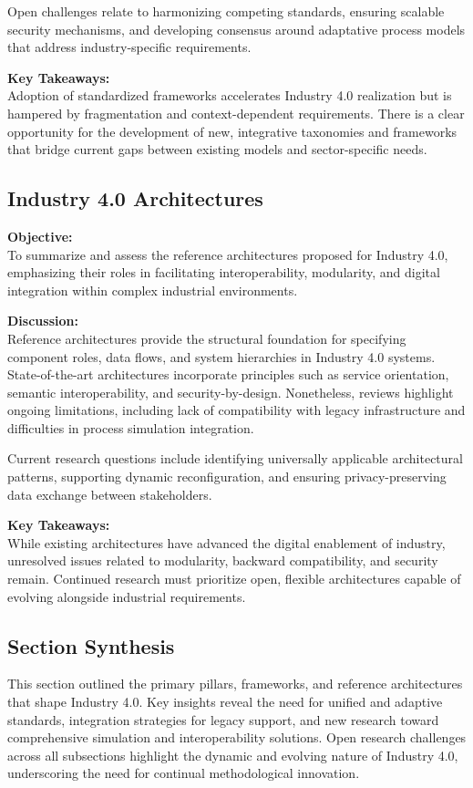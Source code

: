 \documentclass[sigconf]{acmart}
\begin{document}
Open challenges relate to harmonizing competing standards, ensuring scalable security mechanisms, and developing consensus around adaptative process models that address industry-specific requirements.

\textbf{Key Takeaways:}\\
Adoption of standardized frameworks accelerates Industry 4.0 realization but is hampered by fragmentation and context-dependent requirements. There is a clear opportunity for the development of new, integrative taxonomies and frameworks that bridge current gaps between existing models and sector-specific needs.

\subsection{Industry 4.0 Architectures}
\textbf{Objective:}\\
To summarize and assess the reference architectures proposed for Industry 4.0, emphasizing their roles in facilitating interoperability, modularity, and digital integration within complex industrial environments.

\textbf{Discussion:}\\
Reference architectures provide the structural foundation for specifying component roles, data flows, and system hierarchies in Industry 4.0 systems. State-of-the-art architectures incorporate principles such as service orientation, semantic interoperability, and security-by-design. Nonetheless, reviews highlight ongoing limitations, including lack of compatibility with legacy infrastructure and difficulties in process simulation integration.

Current research questions include identifying universally applicable architectural patterns, supporting dynamic reconfiguration, and ensuring privacy-preserving data exchange between stakeholders.

\textbf{Key Takeaways:}\\
While existing architectures have advanced the digital enablement of industry, unresolved issues related to modularity, backward compatibility, and security remain. Continued research must prioritize open, flexible architectures capable of evolving alongside industrial requirements.

\subsection*{Section Synthesis}
This section outlined the primary pillars, frameworks, and reference architectures that shape Industry 4.0. Key insights reveal the need for unified and adaptive standards, integration strategies for legacy support, and new research toward comprehensive simulation and interoperability solutions. Open research challenges across all subsections highlight the dynamic and evolving nature of Industry 4.0, underscoring the need for continual methodological innovation.
\end{document}
